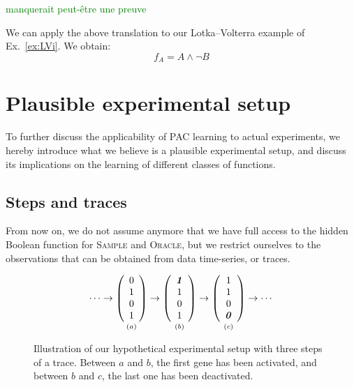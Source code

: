 \documentclass{llncs}
\newcommand{\sylvain}[1]{\textcolor{green}{#1}}
\begin{document}
\sylvain{manquerait peut-être une preuve}


\begin{example}
   We can apply the above translation to our Lotka--Volterra example of
   Ex.~\ref{ex:LVi}. We obtain:
   \[f_A = A \wedge\neg B\]
\end{example}

\section{Plausible experimental setup}

To further discuss the applicability of PAC learning to actual experiments, we hereby introduce what we believe is a plausible experimental setup, and discuss its implications on the learning of different classes of functions.

\subsection{Steps and traces}

From now on, we do not assume anymore that we have full access to the hidden Boolean function for
\textsc{Sample} and \textsc{Oracle}, but we restrict ourselves to the observations that can be obtained from data time-series, or traces.

\begin{figure}[htbp]
	{\large 
	\[
	\cdots
	\rightarrow
	\underset{\vspace{1em}(a)}{
		\left(\begin{array}{c}
		0\\ 1\\ 0\\ 1
		\end{array}\right)}
	\rightarrow
	\underset{\vspace{1em}(b)}{
		\left(\begin{array}{c}
		\textbf{\textit{1}}\\ 1\\ 0\\ 1
		\end{array}\right)}
	\rightarrow
	\underset{\vspace{1em}(c)}{
		\left(\begin{array}{c}
		1\\ 1\\ 0\\ \textbf{\textit 0}
		\end{array}\right)}
	\rightarrow
	\cdots
	\]
}
	\caption{\label{steps}Illustration of our hypothetical experimental setup with three steps of a trace. Between $a$ and $b$, the first gene has been activated, and between $b$ and $c$, the last one has been deactivated.}
\end{figure}
\end{document}
